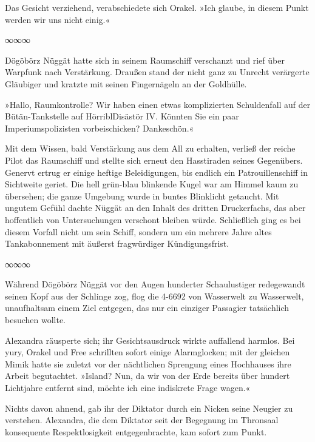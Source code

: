 Das Gesicht verziehend, verabschiedete sich Orakel. »Ich glaube, in diesem Punkt werden wir uns nicht einig.«

\begin{center}
	∞∞∞
\end{center}

Dögöbörz Nüggät hatte sich in seinem Raumschiff verschanzt und rief über Warpfunk nach Verstärkung. Draußen stand der nicht ganz zu Unrecht verärgerte Gläubiger und kratzte mit seinen Fingernägeln an der Goldhülle.

 »Hallo, Raumkontrolle? Wir haben einen etwas komplizierten Schuldenfall auf der Bütän-Tankstelle auf HörriblDisästör IV. Könnten Sie ein paar Imperiumspolizisten vorbeischicken? Dankeschön.«

Mit dem Wissen, bald Verstärkung aus dem All zu erhalten, verließ der reiche Pilot das Raumschiff und stellte sich erneut den Hasstiraden seines Gegenübers. Genervt ertrug er einige heftige Beleidigungen, bis endlich ein Patrouillenschiff in Sichtweite geriet. Die hell grün-blau blinkende Kugel war am Himmel kaum zu übersehen; die ganze Umgebung wurde in buntes Blinklicht getaucht. Mit ungutem Gefühl dachte Nüggät an den Inhalt des dritten Druckerfachs, das aber hoffentlich von Untersuchungen verschont bleiben würde. Schließlich ging es bei diesem Vorfall nicht um sein Schiff, sondern um ein mehrere Jahre altes Tankabonnement mit äußerst fragwürdiger Kündigungsfrist.

\begin{center}
∞∞∞
\end{center}

Während Dögöbörz Nüggät vor den Augen hunderter Schaulustiger redegewandt seinen Kopf aus der Schlinge zog, flog die 4-6692 von Wasserwelt zu Wasserwelt, unaufhaltsam einem Ziel entgegen, das nur ein einziger Passagier tatsächlich besuchen wollte.

Alexandra räusperte sich; ihr Gesichtsausdruck wirkte auffallend harmlos. Bei yury, Orakel und Free schrillten sofort einige Alarmglocken; mit der gleichen Mimik hatte sie zuletzt vor der nächtlichen Sprengung eines Hochhauses ihre Arbeit begutachtet. »Island? Nun, da wir von der Erde bereits über hundert Lichtjahre entfernt sind, möchte ich eine indiskrete Frage wagen.«

Nichts davon ahnend, gab ihr der Diktator durch ein Nicken seine Neugier zu verstehen. Alexandra, die dem Diktator seit der Begegnung im Thronsaal konsequente Respektlosigkeit entgegenbrachte, kam sofort zum Punkt.

